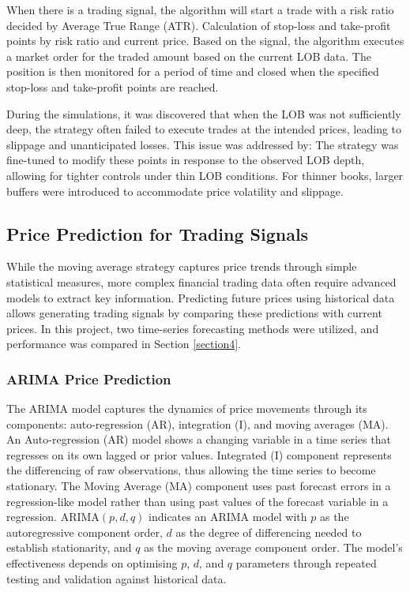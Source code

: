 \documentclass[conference]{IEEEtran}
\begin{document}
When there is a trading signal, the algorithm will start a trade with a risk ratio decided by Average True Range (ATR). Calculation of stop-loss and take-profit points by risk ratio and current price. Based on the signal, the algorithm executes a market order for the traded amount based on the current LOB data. The position is then monitored for a period of time and closed when the specified stop-loss and take-profit points are reached.

During the simulations, it was discovered that when the LOB was not sufficiently deep, the strategy often failed to execute trades at the intended prices, leading to slippage and unanticipated losses. This issue was addressed by:
The strategy was fine-tuned to modify these points in response to the observed LOB depth, allowing for tighter controls under thin LOB conditions. For thinner books, larger buffers were introduced to accommodate price volatility and slippage.

\subsection{Price Prediction for Trading Signals}
While the moving average strategy captures price trends through simple statistical measures, more complex financial trading data often require advanced models to extract key information. Predicting future prices using historical data allows generating trading signals by comparing these predictions with current prices. In this project, two time-series forecasting methods were utilized, and performance was compared in Section \ref{section4}.

\subsubsection{ARIMA Price Prediction}

The ARIMA\cite{b8,b9,b10} model captures the dynamics of price movements through its components: auto-regression (AR), integration (I), and moving averages (MA). An Auto-regression (AR) model shows a changing variable in a time series that regresses on its own lagged or prior values. Integrated (I) component represents the differencing of raw observations, thus allowing the time series to become stationary. The Moving Average (MA) component uses past forecast errors in a regression-like model rather than using past values of the forecast variable in a regression.  $\text{ARIMA}  (p, d, q)$ indicates an ARIMA model with $p$ as the autoregressive component order, $d$ as the degree of differencing needed to establish stationarity, and $q$ as the moving average component order. The model's effectiveness depends on optimising $p$, $d$, and $q$ parameters through repeated testing and validation against historical data.
\end{document}
